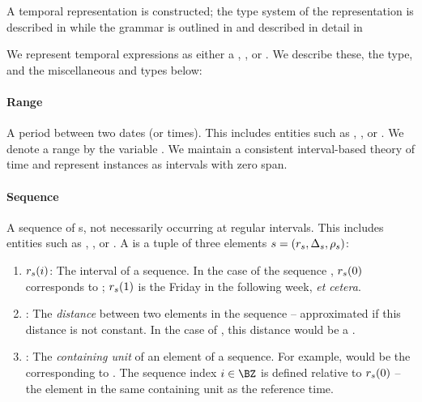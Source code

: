 A temporal representation is constructed; the type system of the representation
	is described in  while the grammar is outlined in
	 and described in detail in 

We represent temporal expressions as either a , ,
	or .
We describe these, the  type, and the miscellaneous
	 and  types below:
\paragraph{Range}
A period between two dates (or times).
This includes entities such as , , or
	.
We denote a range by the variable \range.
We maintain a consistent interval-based theory of time
	\cite{key:1981allen-temporal} and represent instances as intervals with
	zero span.

\paragraph{Sequence}
A sequence of s, not necessarily occurring at regular intervals.
This includes entities such as , , or
	.
A  is a tuple of three elements
	$s=(r_s,\Delta_s,\rho_s)$:
\begin{enumerate}
	\setlength{\itemsep}{-5pt} 
	\item $r_s(i)$: 
		The  interval of a sequence.
		In the case of the sequence , $r_s(0)$ corresponds to
			; 
			$r_s(1)$ is the Friday in the following week, \textit{et cetera}.
	\item \seqjump:
		The \textit{distance} between two elements in the sequence -- approximated
			if this distance is not constant.
		In the case of , this distance would be a .
	\item \seqcanon:
		The \textit{containing unit} of an element of a sequence.
		For example,  would be the 
			corresponding to .
		The sequence index $i \in \BZ$ is defined relative to $r_s(0)$ --
			the element in the same containing unit as the reference time.
\end{enumerate}

